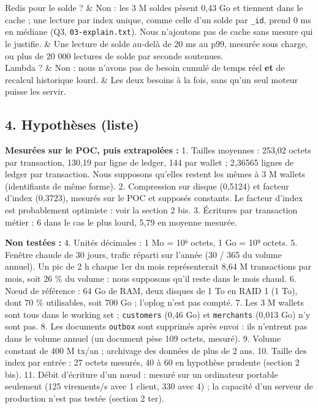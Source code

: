 \documentclass[11pt,a4paper]{article}
\begin{document}
\begin{longtable}[]
		Redis pour le solde ? & Non : les 3 M soldes pèsent 0,43 Go et tiennent dans le cache ; une lecture par index unique, comme celle d'un solde par \texttt{\_id}, prend 0 ms en médiane (Q3, \texttt{03-explain.txt}). Nous n'ajoutons pas de cache sans mesure qui le justifie. & Une lecture de solde au-delà de 20 ms au p99, mesurée sous charge, ou plus de 20 000 lectures de solde par seconde soutenues. \\
		Lambda ? & Non : nous n'avons pas de besoin cumulé de temps réel \textbf{et} de recalcul historique lourd. & Les deux besoins à la fois, sans qu'un seul moteur puisse les servir. \\
	\end{longtable}
	
	\subsection*{4. Hypothèses (liste)}
	
	\textbf{Mesurées sur le POC, puis extrapolées :}
	1. Tailles moyennes : 253,02 octets par transaction, 130,19 par ligne de ledger, 144 par wallet ; 2,36565 lignes de ledger par transaction. Nous supposons qu'elles restent les mêmes à 3 M wallets (identifiants de même forme).
	2. Compression sur disque (0,5124) et facteur d'index (0,3723), mesurés sur le POC et supposés constants. Le facteur d'index est probablement optimiste : voir la section 2 bis.
	3. Écritures par transaction métier : 6 dans le cas le plus lourd, 5,79 en moyenne mesurée.
	
	\textbf{Non testées :}
	4. Unités décimales : 1 Mo = 10⁶ octets, 1 Go = 10⁹ octets.
	5. Fenêtre chaude de 30 jours, trafic réparti sur l'année (30 / 365 du volume annuel). Un pic de 2 h chaque 1er du mois représenterait 8,64 M transactions par mois, soit 26 \% du volume : nous supposons qu'il reste dans le mois chaud.
	6. Nœud de référence : 64 Go de RAM, deux disques de 1 To en RAID 1 (1 To), dont 70 \% utilisables, soit 700 Go ; l'oplog n'est pas compté.
	7. Les 3 M wallets sont tous dans le working set ; \texttt{customers} (0,46 Go) et \texttt{merchants} (0,013 Go) n'y sont pas.
	8. Les documents \texttt{outbox} sont supprimés après envoi : ils n'entrent pas dans le volume annuel (un document pèse 109 octets, mesuré).
	9. Volume constant de 400 M tx/an ; archivage des données de plus de 2 ans.
	10. Taille des index par entrée : 27 octets mesurés, 40 à 60 en hypothèse prudente (section 2 bis).
	11. Débit d'écriture d'un nœud : mesuré sur un ordinateur portable seulement (125 virements/s avec 1 client, 330 avec 4) ; la capacité d'un serveur de production n'est pas testée (section 2 ter).
	
\end{document}
